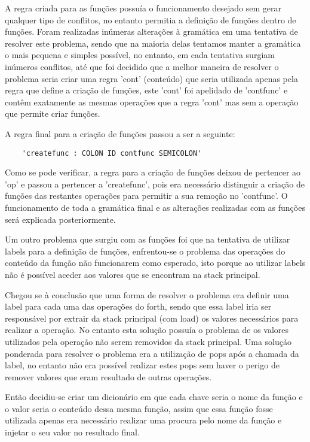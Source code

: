\documentclass{article}
\begin{document}
A regra criada para as funções possuía o funcionamento desejado sem gerar qualquer tipo de conflitos, no entanto permitia a definição de funções dentro de funções. Foram realizadas inúmeras alterações à gramática em uma tentativa de resolver este problema, sendo que na maioria delas tentamos manter a gramática o mais pequena e simples possível, no entanto, em cada tentativa surgiam inúmeros conflitos, até que foi decidido que a melhor maneira de resolver o problema seria criar uma regra 'cont' (conteúdo) que seria utilizada apenas pela regra que define a criação de funções, este 'cont' foi apelidado de 'contfunc' e contêm exatamente as mesmas operações que a regra 'cont' mas sem a operação que permite criar funções. 

A regra final para a criação de funções passou a ser a seguinte:
\begin{verbatim}
    'createfunc : COLON ID contfunc SEMICOLON'
\end{verbatim}
Como se pode verificar, a regra para a criação de funções deixou de pertencer ao 'op' e passou a pertencer a 'createfunc', pois era necessário distinguir a criação de funções das restantes operações para permitir a sua remoção no 'contfunc'. O funcionamento de toda a gramática final e as alterações realizadas com as funções será explicada posteriormente.

Um outro problema que surgiu com as funções foi que na tentativa de utilizar labels para a definição de funções, enfrentou-se o problema das operações do conteúdo da função não funcionarem como esperado, isto porque ao utilizar labels não é possível aceder aos valores que se encontram na stack principal. 

Chegou se à conclusão que uma forma de resolver o problema era definir uma label para cada uma das operações do forth, sendo que essa label iria ser responsável por extrair da stack principal (com load) os valores necessários para realizar a operação. No entanto esta solução possuía o problema de os valores utilizados pela operação não serem removidos da stack principal. Uma solução ponderada para resolver o problema era a utilização de pops após a chamada da label, no entanto não era possível realizar estes pops sem haver o perigo de remover valores que eram resultado de outras operações.

Então decidiu-se criar um dicionário em que cada chave seria o nome da função e o valor seria o conteúdo dessa mesma função, assim que essa função fosse utilizada apenas era necessário realizar uma procura pelo nome da função e injetar o seu valor no resultado final. 
\end{document}
